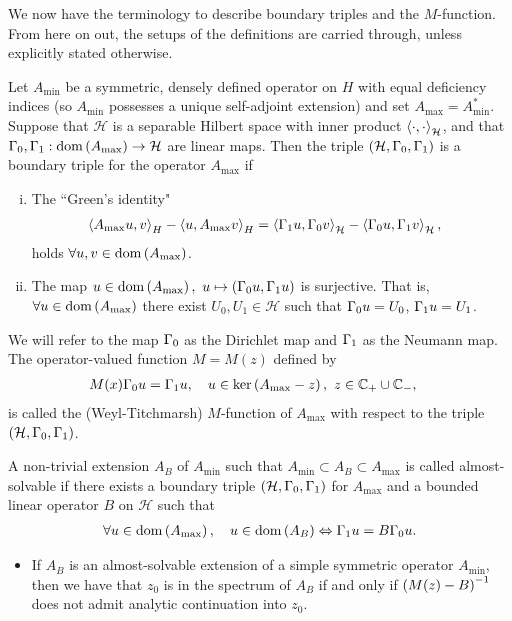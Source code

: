 \documentclass[11pt]{report}
\newcommand{\dom}[1]{\mathrm{dom}\bracs{#1}}
\newcommand{\amin}{A_{\mathrm{min}}}
\newcommand{\amax}{A_{\mathrm{max}}}
\newcommand{\ab}{A_B}
\newcommand{\hilb}{\mathcal{H}}
\begin{document}
We now have the terminology to describe boundary triples and the $M$-function.
From here on out, the setups of the definitions are carried through, unless explicitly stated otherwise.
\begin{definition}
	Let $\amin$ be a symmetric, densely defined operator on $H$ with equal deficiency indices (so $\amin$ possesses a unique self-adjoint extension) and set $\amax = \amin^*$.
	Suppose that $\hilb$ is a separable Hilbert space with inner product $\ip{\cdot}{\cdot}_\hilb$, and that $\dmap, \nmap:\dom{\amax}\rightarrow\hilb$ are linear maps.
	Then the triple $\bracs{\hilb, \dmap, \nmap}$ is a boundary triple for the operator $\amax$ if
	\begin{enumerate}[(i)]
		\item The ``Green's identity"
		\begin{align*}
			\ip{\amax u}{v}_H - \ip{u}{\amax v}_H &= \ip{\nmap u}{\dmap v}_\hilb - \ip{\dmap u}{\nmap v}_\hilb,
		\end{align*}
		holds $\forall u,v\in\dom{\amax}$.
		\item The map $u\in\dom{\amax}, \ u\mapsto\bracs{\dmap u, \nmap u}$ is surjective.
		That is, $\forall u\in\dom{\amax}$ there exist $U_0, U_1\in\hilb$ such that $\Gamma_0 u = U_0$, $\Gamma_1 u = U_1$.
	\end{enumerate}
	We will refer to the map $\Gamma_0$ as the Dirichlet map and $\Gamma_1$ as the Neumann map. \newline
	The operator-valued function $M=M(z)$ defined by
	\begin{align*}
		M(x)\dmap u &= \nmap u, \quad u\in\mathrm{ker}\bracs{\amax - z}, \ z\in\complex_+\cup\complex_-,
	\end{align*}
	is called the (Weyl-Titchmarsh) $M$-function of $\amax$ with respect to the triple $\bracs{\hilb, \dmap, \nmap}$.
\end{definition}
\begin{definition}
	A non-trivial extension $\ab$ of $\amin$ such that $\amin\subset\ab\subset\amax$ is called almost-solvable if there exists a boundary triple $\bracs{\hilb, \dmap, \nmap}$ for $\amax$ and a bounded linear operator $B$ on $\hilb$ such that
	\begin{align*}
		\forall u\in\dom{\amax}, \quad u\in\dom{\ab} \Leftrightarrow \nmap u = B\dmap u.
	\end{align*}
\end{definition}
\begin{itemize}
	\item If $\ab$ is an almost-solvable extension of a simple symmetric operator $\amin$, then we have that $z_0$ is in the spectrum of $\ab$ if and only if $\left( M(z)-B \right)^{-1}$ does not admit analytic continuation into $z_0$.
\end{itemize}
\end{document}

